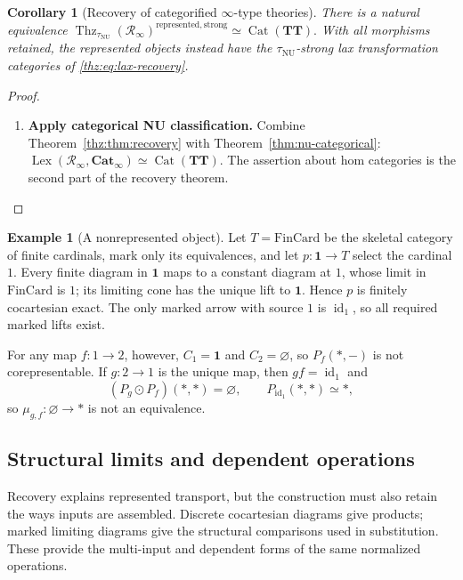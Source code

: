 \documentclass[oneside]{article}
\theoremstyle{plain}
\newtheorem{corollary}[theorem]{Corollary}
\theoremstyle{definition}
\newtheorem{example}[theorem]{Example}
\theoremstyle{remark}
\newcommand{\Cat}{\mathbf{Cat}_{\infty}}
\newcommand{\Lex}{\operatorname{Lex}}
\newcommand{\NU}{\mathrm{NU}}
\newcommand{\RNU}{\mathcal R_{\infty}}
\newcommand{\TT}{\mathbf{TT}}
\newcommand{\Thz}{\operatorname{Thz}}
\newcommand{\id}{\operatorname{id}}
\newcommand{\one}{\mathbf 1}
\begin{document}
\begin{corollary}[Recovery of categorified $\infty$-type theories]\label{thz:cor:categorification}
There is a natural equivalence $\Thz_{\tau_{\NU}}(\RNU)^{\mathrm{represented,strong}} \simeq \operatorname{Cat}(\TT).$ With all morphisms retained, the represented objects instead have the
$\tau_{\NU}$-strong lax transformation categories of
\eqref{thz:eq:lax-recovery}.
\end{corollary}
\begin{proof}
\leavevmode
\begin{enumerate}
\item \textbf{Apply categorical NU classification.} Combine Theorem~\ref{thz:thm:recovery} with Theorem~\ref{thm:nu-categorical}: $\Lex(\RNU,\Cat)\simeq\operatorname{Cat}(\TT).$ The assertion about hom categories is the second part of the recovery
theorem.\qedhere
\end{enumerate}
\end{proof}

\begin{example}[A nonrepresented object]\label{thz:ex:nonrepresented}
Let $T=\mathrm{FinCard}$ be the skeletal category of finite cardinals,
mark only its equivalences, and let $p:\one\to T$ select the cardinal
$1$.  Every finite diagram in $\one$ maps to a constant diagram at
$1$, whose limit in $\mathrm{FinCard}$ is $1$; its limiting
cone has the unique lift to $\one$.  Hence $p$ is finitely
cocartesian exact.  The only marked arrow with source $1$ is
$\id_1$, so all required marked lifts exist.

For any map $f:1\to2$, however, $C_1=\one$ and $C_2=\varnothing$,
so $P_f(*,-)$ is not corepresentable.  If $g:2\to1$ is the unique map,
then $gf=\id_1$ and
\[
 (P_g\odot P_f)(*,*)=\varnothing,
 \qquad
 P_{\id_1}(*,*)\simeq *,
\]
so $\mu_{g,f}:\varnothing\to *$ is not an equivalence.
\end{example}

\subsection{Structural limits and dependent operations}\label{sec:thz:dependent}

Recovery explains represented transport, but the construction must also
retain the ways inputs are assembled. Discrete cocartesian diagrams give
products; marked limiting diagrams give the structural comparisons used
in substitution. These provide the multi-input and dependent forms of the
same normalized operations.
\end{document}
